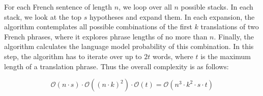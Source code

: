For each French sentence of length $n$, we loop over all $n$ possible
stacks. In each stack, we look at the top $s$ hypotheses and expand them.
In each expansion, the algorithm contemplates all possible combinations of
the first $k$ translations of two French phrases, where it explores phrase
lengths of no more than $n$. Finally, the algorithm calculates the language
model probability of this combination. In this step, the algorithm has to
iterate over up to $2 t$ words, where $t$ is the maximum length of a
translation phrase. Thus the overall complexity is as follows:

\[
    \mathcal{O}(n \cdot s) \cdot \mathcal{O}({(n \cdot k)}^2)
    \cdot \mathcal{O}(t)
    = \mathcal{O}(n^3 \cdot k^2 \cdot s \cdot t)
\]
